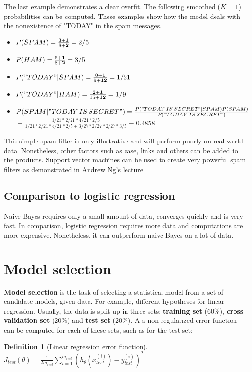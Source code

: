 \documentclass{report}
\newtheorem{definition}{Definition}[section]
\begin{document}
The last example demonstrates a clear overfit. The following smoothed ($K=1$) probabilities can be computed. These examples show how the model deals with the nonexistence of "TODAY" in the spam messages.
\begin{itemize}
\item $P(SPAM) = \frac{3+{\bf 1}}{8+{\bf 2}} = 2/5$
\item $P(HAM) = \frac{5+{\bf 1}}{8+{\bf 2}} = 3/5$
\item $P("TODAY"\vert SPAM) = \frac{0+{\bf 1}}{9+{\bf 12}} = 1/21$
\item $P("TODAY"\vert HAM) = \frac{2+{\bf 1}}{15+{\bf 12}} = 1/9$
\item $P(SPAM\vert "TODAY\,IS\,SECRET")= \frac{P("TODAY\:IS\:SECRET"\vert SPAM)P(SPAM)}{P("TODAY\:IS\:SECRET")}$\\
$=\frac{1/21*2/21*4/21*2/5}{1/21*2/21*4/21*2/5+3/27*2/27*2/27*3/5}=0.4858$
\end{itemize}

This simple spam filter is only illustrative and will perform poorly on real-world data. Nonetheless, other factors such as case, links and others can be added to the products. Support vector machines can be used to create very powerful spam filters as demonstrated in Andrew Ng's lecture.


\subsection{Comparison to logistic regression}
Naive Bayes requires only a small amount of data, converges quickly and is very fast. In comparison, logistic regression requires more data and computations are more expensive. Nonetheless, it can outperform naive Bayes on a lot of data.



\section{Model selection}
\label{ref:modelselection}
{\bf Model selection} is the task of selecting a statistical model from a set of candidate models, given data. For example, different hypotheses for linear regression. Usually, the data is split up in three sets: {\bf training set} (60\%), {\bf cross validation set} (20\%) and {\bf test set} (20\%). A a non-regularized error function can be computed for each of these sets, such as for the test set:

\begin{definition}[Linear regression error function] ~\\
$J_{test}(\theta) = \frac{1}{2m_{test}}\sum_{i=1}^{m_{test}}(h_{\theta}(x_{test}^{(i)})-y_{test}^{(i)})^2$
\end{definition}
\end{document}
